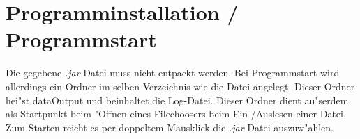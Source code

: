 \section{Programminstallation / Programmstart}
Die gegebene \emph{.jar}-Datei muss nicht entpackt werden. Bei Programmstart wird allerdings ein Ordner im selben Verzeichnis wie die Datei angelegt. Dieser Ordner hei"st \grqq dataOutput\grqq {} und beinhaltet die Log-Datei. Dieser Ordner dient au"serdem als Startpunkt beim "Offnen eines Filechoosers beim Ein-/Auslesen einer Datei. Zum Starten reicht es per doppeltem Mausklick die \emph{.jar}-Datei auszuw"ahlen.